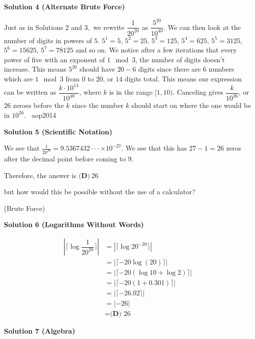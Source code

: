 \begin{enumerate}
\textbf{Solution 4 (Alternate Brute Force)}

Just as in Solutions $2$ and $3,$ we rewrite $\dfrac{1}{20^{20}}$ as $\dfrac{5^{20}}{10^{40}}.$ We can then look at the number of digits in powers of $5$. $5^1=5$, $5^2=25$, $5^3=125$, $5^4=625$, $5^5=3125$, $5^6=15625$, $5^7=78125$ and so on. We notice after a few iterations that every power of five with an exponent of $1 \mod 3$, the number of digits doesn't increase. This means $5^{20}$ should have $20 - 6$ digits since there are $6$ numbers which are $1 \mod 3$ from $0$ to $20$, or $14$ digits total. This means our expression can be written as $\dfrac{k\cdot10^{14}}{10^{40}}$, where $k$ is in the range $[1,10)$. Canceling gives $\dfrac{k}{10^{26}}$, or $26$ zeroes before the $k$ since the number $k$ should start on where the one would be in $10^{26}$. ~aop2014

 



\textbf{Solution 5 (Scientific Notation)}

We see that $\frac{1}{20^{20}} = 9.5367432 \cdot \cdot \cdot \times 10^{-27}$. We see that this has $27-1=26$ zeros after the decimal point before coming to $9$. 

 Therefore, the answer is $\boxed{\textbf{(D)} ~26}$

 
but how would this be possible without the use of a calculator?

 (Brute Force)

 



\textbf{Solution 6 (Logarithms Without Words)}


 \begin{align*}|\lceil \log \dfrac{1}{20^{20}} \rceil| &= |\lceil \log 20^{-20} \rceil| \\ &= |\lceil -20 \log(20) \rceil| \\ &= |\lceil -20(\log 10 + \log 2) \rceil| \\ &= |\lceil -20(1 + 0.301) \rceil| \\ &= |\lceil -26.02 \rceil| \\ &= |-26| \\ &= \boxed{\textbf{(D) } \text{26}} \end{align*}





\textbf{Solution 7 (Algebra)}


\end{enumerate}
